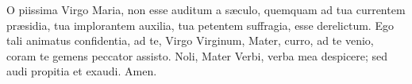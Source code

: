 O piissima Virgo Maria, non esse auditum a s{\ae}culo, quemquam ad tua currentem pr{\ae}sidia, tua implorantem auxilia, 
tua petentem suffragia, esse derelictum. Ego tali animatus confidentia, ad te, Virgo Virginum, Mater, curro, ad te venio, coram te gemens 
peccator assisto. Noli, Mater Verbi, verba mea despicere; sed audi propitia et exaudi. Amen.